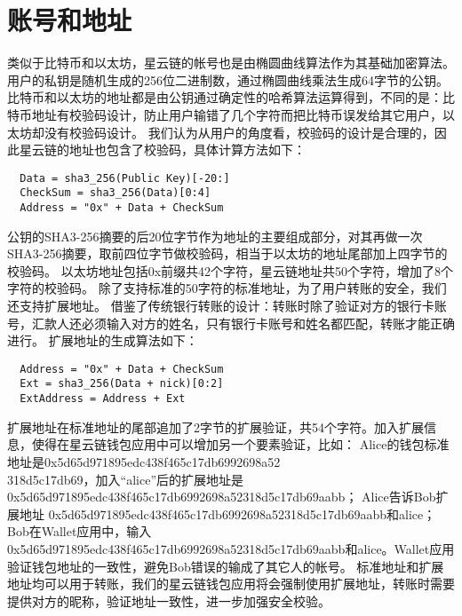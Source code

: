 \section{账号和地址}

类似于比特币和以太坊，星云链的帐号也是由椭圆曲线算法作为其基础加密算法。
用户的私钥是随机生成的256位二进制数，通过椭圆曲线乘法生成64字节的公钥。
比特币和以太坊的地址都是由公钥通过确定性的哈希算法运算得到，不同的是：比特币地址有校验码设计，防止用户输错了几个字符而把比特币误发给其它用户，以太坊却没有校验码设计。
我们认为从用户的角度看，校验码的设计是合理的，因此星云链的地址也包含了校验码，具体计算方法如下：

\begin{verbatim}
  Data = sha3_256(Public Key)[-20:]
  CheckSum = sha3_256(Data)[0:4]
  Address = "0x" + Data + CheckSum
\end{verbatim}

公钥的SHA3-256摘要的后20位字节作为地址的主要组成部分，对其再做一次SHA3-256摘要，取前四位字节做校验码，相当于以太坊的地址尾部加上四字节的校验码。
以太坊地址包括0x前缀共42个字符，星云链地址共50个字符，增加了8个字符的校验码。
	除了支持标准的50字符的标准地址，为了用户转账的安全，我们还支持扩展地址。
	借鉴了传统银行转账的设计：转账时除了验证对方的银行卡账号，汇款人还必须输入对方的姓名，只有银行卡账号和姓名都匹配，转账才能正确进行。
	扩展地址的生成算法如下：

\begin{verbatim}
  Address = "0x" + Data + CheckSum
  Ext = sha3_256(Data + nick)[0:2]
  ExtAddress = Address + Ext
\end{verbatim}

扩展地址在标准地址的尾部追加了2字节的扩展验证，共54个字符。加入扩展信息，使得在星云链钱包应用中可以增加另一个要素验证，比如：
Alice的钱包标准地址是0x5d65d971895edc438f465c17db6992698a52\\318d5c17db69，加入“alice”后的扩展地址是0x5d65d971895edc438f465c17db6992698a52318d5c17db69aabb；
Alice告诉Bob扩展地址 0x5d65d971895edc438f465c17db6992698a52318d5c17db69aabb和alice；
Bob在Wallet应用中，输入 0x5d65d971895edc438f465c17db6992698a52318d5c17db69aabb和alice。Wallet应用验证钱包地址的一致性，避免Bob错误的输成了其它人的帐号。
	标准地址和扩展地址均可以用于转账，我们的星云链钱包应用将会强制使用扩展地址，转账时需要提供对方的昵称，验证地址一致性，进一步加强安全校验。
